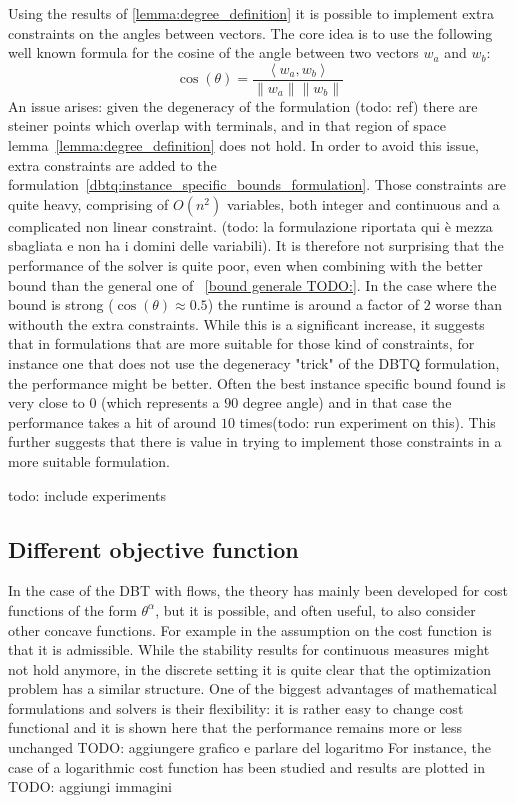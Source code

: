 \documentclass[12pt,a4paper]{article}
\numberwithin{equation}{section}
\theoremstyle{mytheorem}
\theoremstyle{myremark}
\theoremstyle{myparagraph}
\begin{document}
    Using the results of \ref{lemma:degree_definition} it is possible to implement extra constraints on the angles between vectors.
    The core idea is to use the following well known formula for the cosine of the angle between two vectors $w_a$ and $w_b$:
    \begin{equation}
        \cos(\theta) = \frac{ \left< w_a , w_b \right>}{\|w_a\| \|w_b\|}
    \end{equation}
    An issue arises: given the degeneracy of the formulation (todo: ref) there are steiner points which overlap with terminals, and
    in that region of space lemma~\ref{lemma:degree_definition} does not hold. In order to avoid this issue, 
    extra constraints are added to the formulation~\ref{dbtq:instance_specific_bounds_formulation}. 
    Those constraints are quite heavy, comprising of $O(n^2)$ variables, both integer and continuous and a complicated
    non linear constraint. (todo: la formulazione riportata qui è mezza sbagliata e non ha i domini delle variabili).
    It is therefore not surprising that the performance of the solver is quite poor, even when combining with the better bound than the 
    general one of ~\ref{bound generale TODO:}.
    In the case where the bound is strong ($\cos(\theta) \approx 0.5$) the runtime is around a factor of $2$ worse than withouth the extra constraints.
    While this is a significant increase, it suggests that in formulations that are more suitable for those kind of constraints,
    for instance one that does not use the degeneracy "trick" of the DBTQ formulation, the performance might be better.
    Often the best instance specific bound found is very close to $0$ (which represents a $90$ degree angle) and in that case
    the performance takes a hit of around $10$ times(todo: run experiment on this). This further suggests that there is value 
    in trying to implement those constraints in a more suitable formulation.

    todo: include experiments


    \subsection{Different objective function}
    In the case of the DBT with flows, the theory has mainly been developed for cost functions of the form $\theta ^ \alpha$, but it is possible,
    and often useful, to also consider other concave functions. For example in \cite{degree3} the assumption on the cost function is that it is admissible.
    While the stability results for continuous measures might not hold anymore, in the discrete setting it is quite clear that the optimization problem has a similar
    structure.
    One of the biggest advantages of mathematical formulations and solvers is their flexibility: it is rather easy to change cost functional and it is shown here that
    the performance remains more or less unchanged TODO: aggiungere grafico e parlare del logaritmo
    For instance, the case of a logarithmic cost function has been studied and results are plotted in TODO: aggiungi immagini
\end{document}
